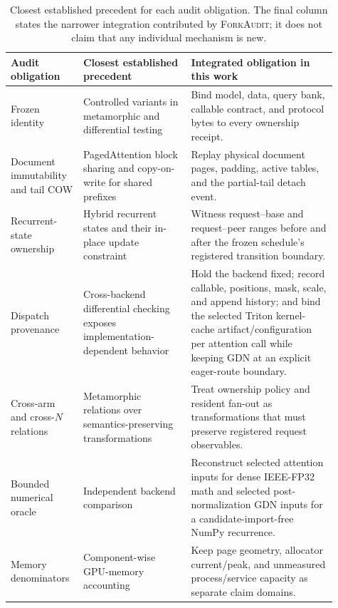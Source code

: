 \documentclass{article}
\newcommand{\method}{\textsc{ForkAudit}}
\begin{document}
\begin{table}[H]
\caption{Closest established precedent for each audit obligation.  The final
column states the narrower integration contributed by \method{}; it does not
claim that any individual mechanism is new.}
\centering\scriptsize
\begin{tabular}{@{}p{0.18\linewidth}p{0.31\linewidth}p{0.42\linewidth}@{}}
\toprule
Audit obligation & Closest established precedent & Integrated obligation in this work \\
\midrule
Frozen identity & Controlled variants in metamorphic and differential testing~\citep{chen2018metamorphic,xiao2022metamorphic,pham2019cradle} & Bind model, data, query bank, callable contract, and protocol bytes to every ownership receipt. \\
Document immutability and tail COW & PagedAttention block sharing and copy-on-write for shared prefixes~\citep{kwon2023pagedattention} & Replay physical document pages, padding, active tables, and the partial-tail detach event. \\
Recurrent-state ownership & Hybrid recurrent states and their in-place update constraint~\citep{yang2025gateddeltanet,pan2025marconi} & Witness request--base and request--peer ranges before and after the frozen schedule's registered transition boundary. \\
Dispatch provenance & Cross-backend differential checking exposes implementation-dependent behavior~\citep{pham2019cradle} & Hold the backend fixed; record callable, positions, mask, scale, and append history; and bind the selected Triton kernel-cache artifact/configuration per attention call while keeping GDN at an explicit eager-route boundary. \\
Cross-arm and cross-$N$ relations & Metamorphic relations over semantics-preserving transformations~\citep{chen2018metamorphic,xiao2022metamorphic} & Treat ownership policy and resident fan-out as transformations that must preserve registered request observables. \\
Bounded numerical oracle & Independent backend comparison~\citep{pham2019cradle} & Reconstruct selected attention inputs for dense IEEE-FP32 math and selected post-normalization GDN inputs for a candidate-import-free NumPy recurrence. \\
Memory denominators & Component-wise GPU-memory accounting~\citep{gao2020dnnmem} & Keep page geometry, allocator current/peak, and unmeasured process/service capacity as separate claim domains. \\
\bottomrule
\end{tabular}
\end{table}
\end{document}
